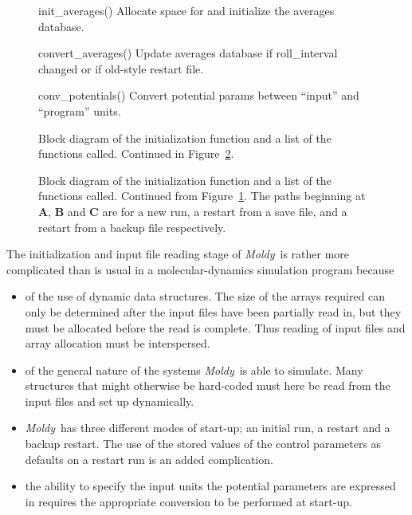 \documentclass[a4paper,twoside]{report}
\newcommand{\moldy}{\emph{Moldy}}
\begin{document}
\begin{figure}[tb]
\begin{minipage}[b]{2.55in}
\begin{Litdescription}
\item[init\_averages()] Allocate space for and initialize the averages
  database.
\item[convert\_averages()] Update averages database if roll\_interval
  changed or if old-style restart file.
\item[conv\_potentials()] Convert potential params between ``input''
  and ``program'' units.
\end{Litdescription}
\end{minipage}
\renewcommand{\thefigure}{\arabic{chapter}.\arabic{figure}(a)}
\caption[Block diagram of initialization function ]{%
  Block diagram of the initialization function  and a
  list of the functions called. Continued in Figure~\ref{fig:startup-b}.}
\label{fig:startup-a}
\end{figure}

\addtocounter{figure}{-1}
\begin{figure}[tb]
\centering

\renewcommand{\thefigure}{\arabic{chapter}.\arabic{figure}(b)}
\caption[Block diagram of initialization function ]{%
  Block diagram of the initialization function
   and a list of the functions called.  Continued
  from Figure~\ref{fig:startup-a}.  The paths beginning at \textbf{A},
  \textbf{B} and \textbf{C} are for a new run, a restart from a save
  file, and a restart from a backup file respectively.}
\label{fig:startup-b}
\end{figure}


The initialization and input file reading stage of \moldy\ is rather
more complicated than is usual in a molecular-dynamics simulation
program because
\begin{itemize}
\item of the use of dynamic data structures.  The size of the arrays
  required can only be determined after the input files have been
  partially read in, but they must be allocated before the read is
  complete. Thus reading of input files and array allocation must be
  interspersed.
\item of the general nature of the systems \moldy\ is able to simulate.
  Many structures that might otherwise be hard-coded must here be read
  from the input files and set up dynamically.
\item \moldy\ has three different modes of start-up; an initial run,
  a restart and a backup restart.  The use of the stored values of the
  control parameters as defaults on a restart run is an added
  complication. 
\item the ability to specify the input units the potential parameters
  are expressed in requires the appropriate conversion to be performed
  at start-up.
\end{itemize}
\end{document}
